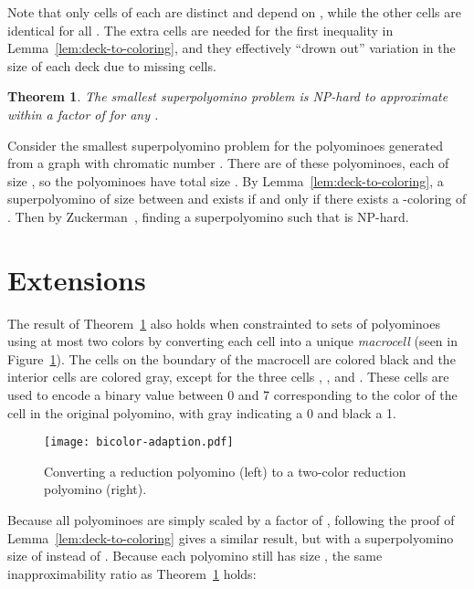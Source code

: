 \documentclass{article}
\newtheorem{theorem}{Theorem}[section]
\newenvironment{proof}[1][Proof]{\begin{trivlist}
\item[\hskip \labelsep {\bfseries #1}]}{\end{trivlist}}
\newcommand{\ccNP}{\textrm{\textsc{NP}}}
\begin{document}
Note that only  cells of each  are distinct and depend on , while the other  cells are identical for all .
The extra cells are needed for the first inequality in Lemma~\ref{lem:deck-to-coloring}, and they effectively ``drown out'' variation in the size of each deck due to missing cells.

\begin{theorem}
\label{thm:ssp-inapprox}
The smallest superpolyomino problem is \ccNP-hard to approximate within a factor of  for any .
\end{theorem}

\begin{proof}
Consider the smallest superpolyomino problem for the polyominoes generated from a graph  with chromatic number .
There are  of these polyominoes, each of size , so the polyominoes have total size .
By Lemma~\ref{lem:deck-to-coloring}, a superpolyomino of size between  and  exists if and only if there exists a -coloring of .
Then by Zuckerman~\cite{Zuckerman-2007}, finding a superpolyomino such that  is \ccNP-hard.
\end{proof}

\section{Extensions}

The result of Theorem~\ref{thm:ssp-inapprox} also holds when constrainted to sets of polyominoes using at most two colors by converting each cell into a unique  \emph{macrocell} (seen in Figure~\ref{fig:bicolor-adaption}).
The cells on the boundary of the macrocell are colored black and the interior cells are colored gray, except for the three cells , , and . 
These cells are used to encode a binary value between 0 and 7 corresponding to the color of the cell in the original polyomino, with gray indicating a 0 and black a 1.

\begin{figure}[ht]
\centering
\texttt{[image: bicolor-adaption.pdf]}
\caption{Converting a reduction polyomino (left) to a two-color reduction polyomino (right).}
\label{fig:bicolor-adaption}
\end{figure}

Because all polyominoes are simply scaled by a factor of , following the proof of Lemma~\ref{lem:deck-to-coloring} gives a similar result, but with a superpolyomino size of  instead of .
Because each polyomino still has size , the same inapproximability ratio as Theorem~\ref{thm:ssp-inapprox} holds:
\end{document}
